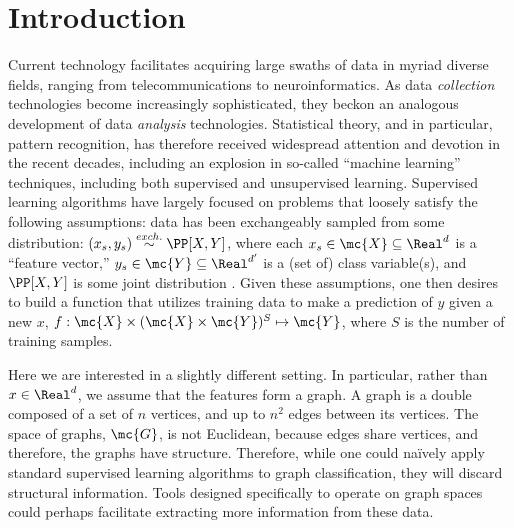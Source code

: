 




\section{Introduction} %
\label{sec:introduction}

Current technology facilitates acquiring large swaths of data in myriad diverse fields, ranging from telecommunications to neuroinformatics. As  data \emph{collection} technologies become increasingly sophisticated,  they beckon an analogous development of data \emph{analysis} technologies.  Statistical theory, and in particular, pattern recognition, has therefore received widespread attention and devotion in the recent decades, including an explosion in so-called ``machine learning'' techniques, including both supervised and unsupervised learning.  Supervised learning algorithms have largely focused on problems that loosely satisfy the following assumptions: data has been exchangeably sampled from some distribution: $(x_s,y_s) \overset{exch.}{\sim} \PP[X,Y]$, where each $x_s \in \mc{X} \subseteq \Real^d$ is a ``feature vector,'' $y_s \in \mc{Y} \subseteq\Real^{d'}$ is a (set of) class variable(s), and $\PP[X,Y]$ is some joint distribution \cite{DGL96}.  Given these assumptions, one then desires to build a function that utilizes training data to make a prediction of $y$ given a new $x$, $f: \mc{X} \times (\mc{X} \times \mc{Y})^S \mapsto \mc{Y}$, where $S$ is the number of training samples.  

Here we are interested in a slightly different setting.  In particular, rather than $x \in \Real^d$,  we assume that the features form a graph.  A graph is a double composed of a set of $n$ vertices, and up to $n^2$ edges between its vertices.   The space of graphs, $\mc{G}$, is not Euclidean, because edges share vertices, and therefore, the graphs have structure.  Therefore, while one could na\"ively apply standard supervised learning algorithms to graph classification, they will discard structural information. Tools designed specifically to operate on graph spaces could perhaps facilitate extracting more information from these data.

